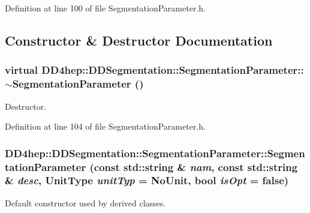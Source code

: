 Definition at line 100 of file SegmentationParameter.h.

\subsection{Constructor \& Destructor Documentation}
\hypertarget{class_d_d4hep_1_1_d_d_segmentation_1_1_segmentation_parameter_a3969aaa62788ba8e9c5fe9f1ce60fe98}{
\subsubsection[{$\sim$SegmentationParameter}]{\setlength{\rightskip}{0pt plus 5cm}virtual DD4hep::DDSegmentation::SegmentationParameter::$\sim$SegmentationParameter ()}}
\label{class_d_d4hep_1_1_d_d_segmentation_1_1_segmentation_parameter_a3969aaa62788ba8e9c5fe9f1ce60fe98}


Destructor. 

Definition at line 104 of file SegmentationParameter.h.\hypertarget{class_d_d4hep_1_1_d_d_segmentation_1_1_segmentation_parameter_ae3d7cad507474b45ed2aea1629b8a919}{
\subsubsection[{SegmentationParameter}]{\setlength{\rightskip}{0pt plus 5cm}DD4hep::DDSegmentation::SegmentationParameter::SegmentationParameter (const std::string \& {\em nam}, \/  const std::string \& {\em desc}, \/  {\bf UnitType} {\em unitTyp} = {\ttfamily NoUnit}, \/  bool {\em isOpt} = {\ttfamily false})}}
\label{class_d_d4hep_1_1_d_d_segmentation_1_1_segmentation_parameter_ae3d7cad507474b45ed2aea1629b8a919}


Default constructor used by derived classes. 

